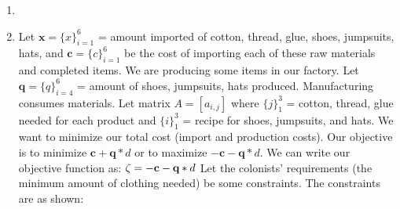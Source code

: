 \documentclass{article}
\begin{document}
\begin{enumerate}
\begin{enumerate}
\begin{enumerate} [label = \roman*]
                $\\ x_1 \leq 3$
                $\\ x_1 \leq 4$
                \newline $x_1$ enters and $x_0$ leaves.
                \newline New solution is:
                $\\x_1 = 3$
                $\\x_2, x_0, w_1, w_2 = 0$
                \newline Rewrite constraints.
                $\\ x_1 = 3 + w_1 - x_0 - x_2$
                $\\ w_2 = 4 - (3 + w_1 - x_0 - x_2) - 2x_2 + x_0$
                $\\\to w_2 = 4 - 3 - w_1 + x_0 + x_2 - 2x_2 + x_0$
                $\\\to w_2 = 1 - w_1 - x_2 + 2x_0$
                \newline Rewrite objective function.
                $\\\zeta = -w_1 - 3 + (3 + w_1 - x_0 - x_2) + x_2$
                $\\\to \zeta = 0 - x_0$
        \end{enumerate}
    \end{enumerate}
    \newpage
    \item %
    \newpage
    \item %
        Let $\textbf{x} = \{x\}_{i=1}^6$ = amount imported of cotton, thread, glue, shoes, jumpsuits, hats, and $\textbf{c} = \{c\}_{i=1}^6$ be the cost of importing each of these raw materials and completed items.
        \newline We are producing some items in our factory. Let $\textbf{q} = \{q\}_{i=4}^6$ = amount of shoes, jumpsuits, hats produced.
        \newline Manufacturing consumes materials. Let matrix $A = [a_{i,j}]$ where $\{j\}_1^3$ = cotton, thread, glue needed for each product and $\{i\}_1^3$ = recipe for shoes, jumpsuits, and hats.
        \newline We want to minimize our total cost (import and production costs). Our objective is to minimize $\textbf{c}+\textbf{q}*d$ or to maximize $-\textbf{c}-\textbf{q}*d$. We can write our objective function as:
        $\\\zeta = -\textbf{c}-\textbf{q}*d$
        \newline Let the colonists' requirements (the minimum amount of clothing needed) be some constraints. The constraints are as shown:

\end{enumerate}
\end{document}
